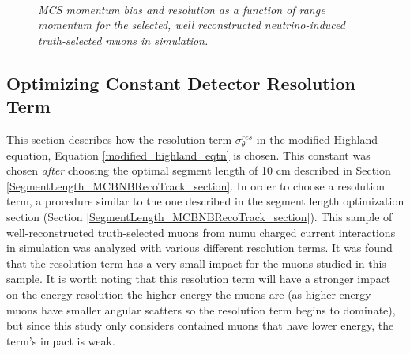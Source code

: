\begin{figure}
\centering
\mbox{
	\quad
	}
\caption{\textit{MCS momentum bias and resolution as a function of range momentum for the selected, well reconstructed neutrino-induced truth-selected muons in simulation.}}
\label{seglenstudy_bias_resolution_MCBNBRecoTrack_fig}
\end{figure}



\subsection{Optimizing Constant Detector Resolution Term}\label{ResolutionStudy_MCBNBRecoTrack_section}
This section describes how the resolution term $\sigma_\theta^{res}$ in the modified Highland equation, Equation \ref{modified_highland_eqtn} is chosen. This constant was chosen \textit{after} choosing the optimal segment length of 10 cm described in Section \ref{SegmentLength_MCBNBRecoTrack_section}. In order to choose a resolution term, a procedure similar to the one described in the segment length optimization section (Section \ref{SegmentLength_MCBNBRecoTrack_section}). This sample of well-reconstructed truth-selected muons from numu charged current interactions in simulation was analyzed with various different resolution terms. It was found that the resolution term has a very small impact for the muons studied in this sample. It is worth noting that this resolution term will have a stronger impact on the energy resolution the higher energy the muons are (as higher energy muons have smaller angular scatters so the resolution term begins to dominate), but since this study only considers contained muons that have lower energy, the term's impact is weak.\\

